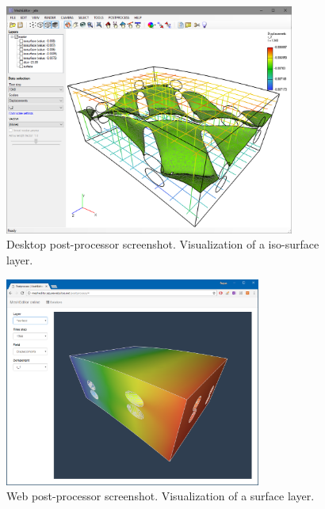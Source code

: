 \begin{figure}[H]
    \centering
    \includegraphics[width=0.85\textwidth]{figures/chapter-data-management/desktop-postprocessor-isosurface}
    \decoRule
    \caption{Desktop post-processor screenshot. Visualization of a iso-surface layer.}
    \label{fig:desktop-postprocessor-isosurface}
\end{figure}


\begin{figure}[H]
    \centering
    \includegraphics[width=0.75\textwidth]{figures/chapter-data-management/web-postprocessor-surface}
    \decoRule
    \caption{Web post-processor screenshot. Visualization of a surface layer.}
    \label{fig:web-postprocessor-surface}
\end{figure}


